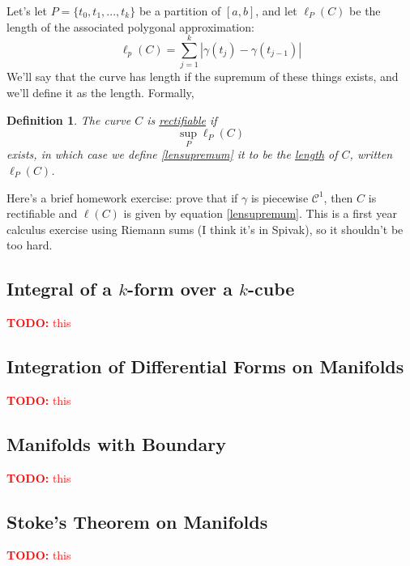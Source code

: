 \documentclass{article}
\newtheorem{definition}{Definition}
\newcommand{\mc}[1]{\mathcal{#1}}
\newcommand{\TODO}[1]{\textcolor{red}{\textbf{TODO:} #1}}
\begin{document}
Let's let \(P = \{t_0,t_1,...,t_k\}\) be a partition of \([a, b]\), and let \(\ell_P(C)\) be the length of the associated polygonal approximation:
\begin{equation}
  \ell_p(C) = \sum_{j = 1}^k|\gamma(t_j) - \gamma(t_{j - 1})|
\end{equation}
We'll say that the curve has length if the supremum of these things exists, and we'll define it as the length. Formally,
\begin{definition}
  The curve \(C\) is \underline{rectifiable} if
  \begin{equation}
    \sup_P\ell_P(C)
    \label{lensupremum}
  \end{equation}
  exists, in which case we define \ref{lensupremum} it to be the \underline{length} of \(C\), written \(\ell_P(C)\).
\end{definition}
Here's a brief homework exercise: prove that if \(\gamma\) is piecewise \(\mc{C}^1\), then \(C\) is rectifiable and \(\ell(C)\) is given by equation \ref{lensupremum}. This is a first year calculus exercise using Riemann sums (I think it's in Spivak), so it shouldn't be too hard.



\subsection{Integral of a \(k\)-form over a \(k\)-cube}

\TODO{this}

\subsection{Integration of Differential Forms on Manifolds}

\TODO{this}

\subsection{Manifolds with Boundary}

\TODO{this}

\subsection{Stoke's Theorem on Manifolds}

\TODO{this}
\end{document}
